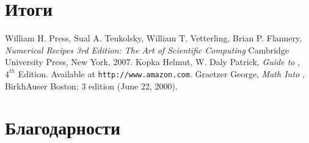 \documentclass[openany]{book}
\theoremstyle{definition}
\begin{document}
\chapter{Итоги}\label{ch7}
\pagestyle{fancy}

\backmatter

\begin{thebibliography}{99}
    \textenglish{William H. Press, Sual A. Teukolsky, William T. Vetterling, Brian P. Flannery, \emph{Numerical Recipes 3rd Edition: The Art of Scientific Computing}
    Cambridge University Press, New York, 2007.}
    \textenglish{Kopka Helmut, W. Daly Patrick,
    \emph{Guide to \text{\LaTeX}}, $4^{th}$ Edition. Available at \texttt{http://www.amazon.com}.}
    \textenglish{Graetzer George, \emph{Math Into \text{\LaTeX}},
    BirkhAuser Boston; 3 edition (June 22, 2000).}    
\end{thebibliography}


\chapter{Благодарности}
\pagestyle{fancy}
\end{document}
